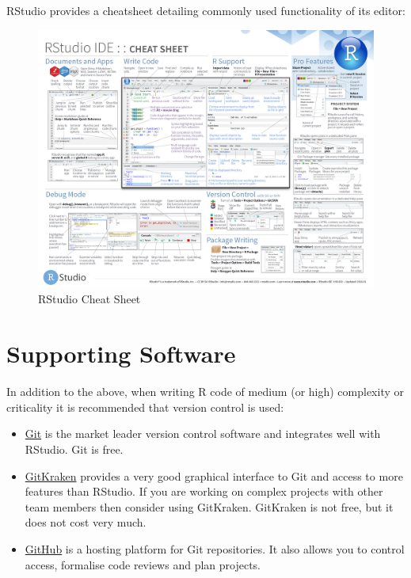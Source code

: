 \documentclass[]{book}
\providecommand{\tightlist}{%
  \setlength{\itemsep}{0pt}\setlength{\parskip}{0pt}}
\begin{document}
RStudio provides a cheatsheet detailing commonly used functionality of its editor:

\begin{figure}

{\centering \includegraphics[width=0.8\linewidth]{images/rstudio-ide} 

}

\caption{RStudio Cheat Sheet}\label{fig:rstudio-cheatsheet}
\end{figure}

\hypertarget{supporting-software}{%
\section{Supporting Software}\label{supporting-software}}

In addition to the above, when writing R code of medium (or high) complexity or criticality it is
recommended that version control is used:

\begin{itemize}
\tightlist
\item
  \href{http://gitforwindows.org/}{Git} is the market leader version control software and integrates
  well with RStudio. Git is free.
\item
  \href{https://www.gitkraken.com/}{GitKraken} provides a very good graphical interface to
  Git and access to more features than RStudio. If you are working on complex projects with other
  team members then consider using GitKraken. GitKraken is not free, but it does not cost very
  much.
\item
  \href{https://help.github.com/}{GitHub} is a hosting platform for Git repositories. It also allows
  you to control access, formalise code reviews and plan projects.
\end{itemize}
\end{document}

